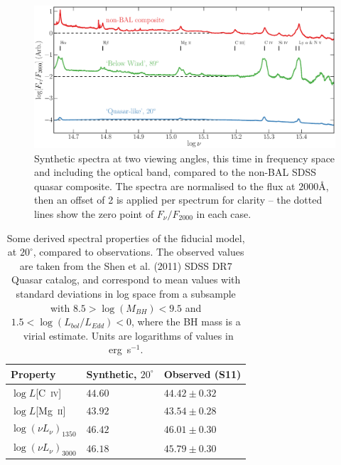 \documentclass[useAMS,usenatbib]{mn2e_x}
\begin{document}
\begin{figure}
\centering
\includegraphics[width=1.0\textwidth]{figures/fig5.eps}
\caption
{
Synthetic spectra at two viewing angles, 
this time in frequency space and including the optical band,
compared to the non-BAL SDSS quasar composite. The spectra are normalised to the flux at 
$2000$\AA, then an offset of 2 is applied per spectrum for clarity -- the dotted lines show the zero point of $F_\nu / F_{2000}$ in each case.
}
\label{fig:sed}
\end{figure}


\begin{table}
\begin{tabular}{p{2cm}p{2cm}p{3cm}}
\hline Property & Synthetic, $20^\circ$ & Observed  (S11) \\ 
\hline \hline
$\log L$[C~\textsc{iv}]  & $44.60$ & $44.42 \pm 0.32$  \\
$\log L$[Mg~\textsc{ii}] & $43.92$ & $43.54 \pm 0.28$  \\
$\log (\nu L_{\nu})_{1350}$  & $46.42$ & $46.01 \pm 0.30$ \\
$\log (\nu L_{\nu})_{3000}$  & $46.18$ & $45.79 \pm 0.30$ \\
\hline
\end{tabular}
\caption{
Some derived spectral properties of the fiducial model, at $20^\circ$,
compared to observations. The observed values are taken from the Shen et al. (2011)
SDSS DR7 Quasar catalog, and correspond to mean values with standard deviations in log space
from a subsample with $8.5>\log(M_{BH})<9.5$ and $1.5<\log (L_{bol}/L_{Edd}) < 0$,
where the BH mass is a \civ\ virial estimate. 
Units are logarithms of values in erg~s$^{-1}$.
}
\label{line_lums}
\end{table}
\end{document}
